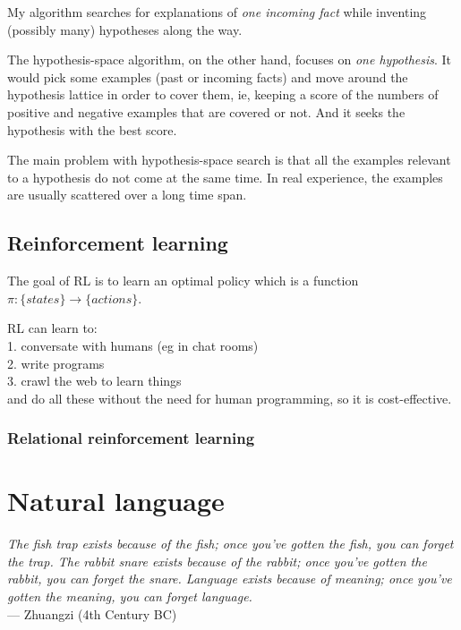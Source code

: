 \documentclass[a4paper]{report}
\begin{document}
\begin{compactenum}[\textbullet ]
\item  My algorithm searches for explanations of \textit{one incoming fact} while inventing (possibly many) hypotheses along the way.
\item  The hypothesis-space algorithm, on the other hand, focuses on \textit{one hypothesis}.  It would pick some examples (past or incoming facts) and move around the hypothesis lattice in order to cover them, ie, keeping a score of the numbers of positive and negative examples that are covered or not.  And it seeks the hypothesis with the best score.\\
\end{compactenum}

The main problem with hypothesis-space search is that all the examples relevant to a hypothesis do not come at the same time.  In real experience, the examples are usually scattered over a long time span.


\section{Reinforcement learning} 

The goal of RL is to learn an optimal policy which is a function $\pi: \{states\} \rightarrow \{actions\}$.

RL can learn to:\\
1.  conversate with humans (eg in chat rooms)\\
2.  write programs\\
3.  crawl the web to learn things\\
and do all these without the need for human programming, so it is cost-effective.

\subsection{Relational reinforcement learning}

\chapter{Natural language}
\begin{flushright}
\emph{The fish trap exists because of the fish; once you've gotten the fish, you can forget the trap. The rabbit snare exists because of the rabbit; once you've gotten the rabbit, you can forget the snare. Language exists because of meaning; once you've gotten the meaning, you can forget language.}\\ --- Zhuangzi (4th Century BC)
\end{flushright}
\minitoc
\end{document}
